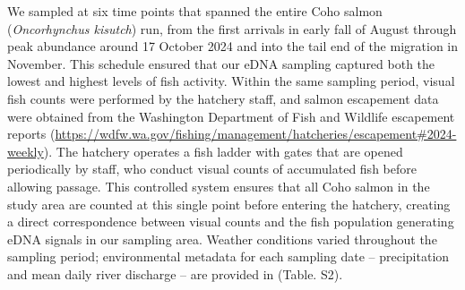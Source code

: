 \documentclass{article}
\begin{document}
We sampled at six time points that spanned the entire Coho salmon (\textit{Oncorhynchus kisutch}) run, from the first arrivals in early fall of August through peak abundance around 17 October 2024 and into the tail end of the migration in November. This schedule ensured that our eDNA sampling captured both the lowest and highest levels of fish activity. Within the same sampling period, visual fish counts were performed by the hatchery staff, and salmon escapement data were obtained from the Washington Department of Fish and Wildlife escapement reports (\href{https://wdfw.wa.gov/fishing/management/hatcheries/escapement#2024-weekly}{https://wdfw.wa.gov/fishing/management/hatcheries/escapement\#2024-weekly}). The hatchery operates a fish ladder with gates that are opened periodically by staff, who conduct visual counts of accumulated fish before allowing passage. This controlled system ensures that all Coho salmon in the study area are counted at this single point before entering the hatchery, creating a direct correspondence between visual counts and the fish population generating eDNA signals in our sampling area. Weather conditions varied throughout the sampling period; environmental metadata for each sampling date -- precipitation  and mean daily river discharge -- are provided in (Table. S2). 
\end{document}
